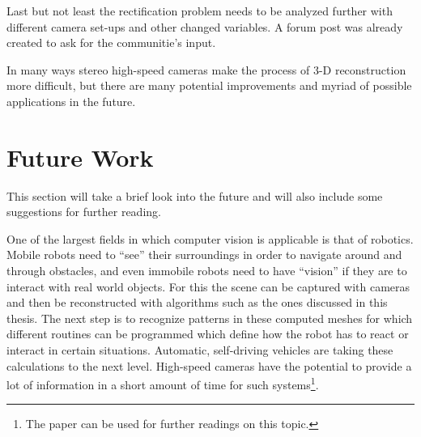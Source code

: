 Last but not least the rectification problem needs to be analyzed further with different camera set-ups and other changed variables. A forum post was already created to ask for the communitie's input.

In many ways stereo high-speed cameras 
make the process of 3-D reconstruction more difficult, but there are many potential improvements and myriad of possible applications in the future.

\section{Future Work}\label{sec:Future}
This section will take a brief look into the future and will also include some suggestions for further reading.

One of the largest fields in which computer vision is applicable is that of robotics. Mobile robots need to \enquote{see} their surroundings in order to navigate around and through obstacles, and even immobile robots need to have \enquote{vision} if they are to interact with real world objects. For this the scene can be captured with cameras and then be reconstructed with algorithms such as the ones discussed in this thesis. The next step is to recognize patterns in these computed meshes for which different routines can be programmed which define how the robot has to react or interact in certain situations.
Automatic, self-driving vehicles are taking these calculations to the next level.
High-speed cameras have the potential to provide a lot of information in a short amount of time for such systems\footnote{The paper \cite{Lowe.2001} can be used for further readings on this topic.}.
